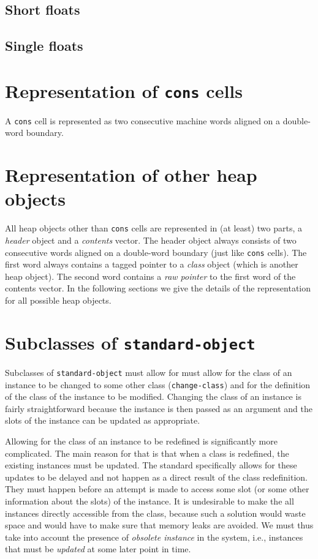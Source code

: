 \subsection{Short floats}

\subsection{Single floats}

\section{Representation of \texttt{cons} cells}

A \texttt{cons} cell is represented as two consecutive machine
words aligned on a double-word boundary.

\section{Representation of other heap objects}

All heap objects other than \texttt{cons} cells are represented in (at
least) two parts, a \emph{header} object and a \emph{contents} vector.
The header object always consists of two consecutive words aligned on
a double-word boundary (just like \texttt{cons} cells).  The first
word always contains a tagged pointer to a \emph{class} object (which
is another heap object).  The second word contains a \emph{raw
  pointer} to the first word of the contents vector.  In the following
sections we give the details of the representation for all possible
heap objects.

\section{Subclasses of \texttt{standard-object}}

Subclasses of \texttt{standard-object} must allow for must allow for
the class of an instance to be changed to some other class
(\texttt{change-class}) and for the definition of the class of the
instance to be modified.  Changing the class of an instance is fairly
straightforward because the instance is then passed as an argument and
the slots of the instance can be updated as appropriate.

Allowing for the class of an instance to be redefined is significantly
more complicated.  The main reason for that is that when a class is
redefined, the existing instances must be updated.  The standard
specifically allows for these updates to be delayed and not happen as
a direct result of the class redefinition.  They must happen before an
attempt is made to access some slot (or some other information about
the slots) of the instance.  It is undesirable to make the all
instances directly accessible from the class, because such a solution
would waste space and would have to make sure that memory leaks are
avoided.  We must thus take into account the presence of
\emph{obsolete instance} in the system, i.e., instances that must be
\emph{updated} at some later point in time. 

